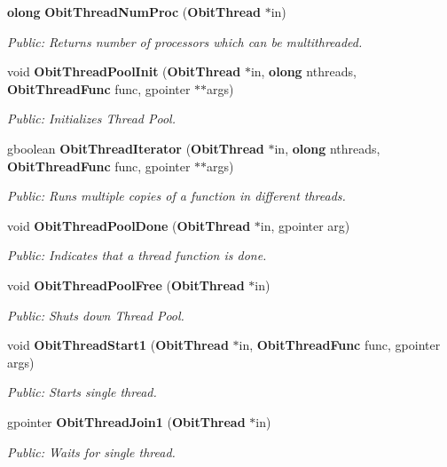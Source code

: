 \begin{CompactItemize}
{\bf olong} {\bf Obit\-Thread\-Num\-Proc} ({\bf Obit\-Thread} $\ast$in)
\begin{CompactList}\small\item\em Public: Returns number of processors which can be multithreaded. \item\end{CompactList}\item 
void {\bf Obit\-Thread\-Pool\-Init} ({\bf Obit\-Thread} $\ast$in, {\bf olong} nthreads, {\bf Obit\-Thread\-Func} func, gpointer $\ast$$\ast$args)
\begin{CompactList}\small\item\em Public: Initializes Thread Pool. \item\end{CompactList}\item 
gboolean {\bf Obit\-Thread\-Iterator} ({\bf Obit\-Thread} $\ast$in, {\bf olong} nthreads, {\bf Obit\-Thread\-Func} func, gpointer $\ast$$\ast$args)
\begin{CompactList}\small\item\em Public: Runs multiple copies of a function in different threads. \item\end{CompactList}\item 
void {\bf Obit\-Thread\-Pool\-Done} ({\bf Obit\-Thread} $\ast$in, gpointer arg)
\begin{CompactList}\small\item\em Public: Indicates that a thread function is done. \item\end{CompactList}\item 
void {\bf Obit\-Thread\-Pool\-Free} ({\bf Obit\-Thread} $\ast$in)
\begin{CompactList}\small\item\em Public: Shuts down Thread Pool. \item\end{CompactList}\item 
void {\bf Obit\-Thread\-Start1} ({\bf Obit\-Thread} $\ast$in, {\bf Obit\-Thread\-Func} func, gpointer args)
\begin{CompactList}\small\item\em Public: Starts single thread. \item\end{CompactList}\item 
gpointer {\bf Obit\-Thread\-Join1} ({\bf Obit\-Thread} $\ast$in)
\begin{CompactList}\small\item\em Public: Waits for single thread. \item\end{CompactList}\item 

\end{CompactItemize}
